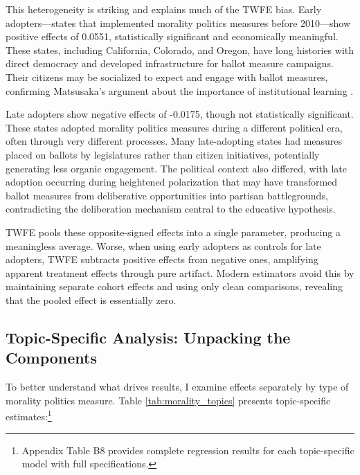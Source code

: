 \documentclass[12pt,letterpaper,oneside]{book}
\begin{document}
This heterogeneity is striking and explains much of the TWFE bias. Early adopters---states that implemented morality politics measures before 2010---show positive effects of 0.0551, statistically significant and economically meaningful. These states, including California, Colorado, and Oregon, have long histories with direct democracy and developed infrastructure for ballot measure campaigns. Their citizens may be socialized to expect and engage with ballot measures, confirming Matsusaka's argument about the importance of institutional learning \citep{matsusaka2004many}.

Late adopters show negative effects of -0.0175, though not statistically significant. These states adopted morality politics measures during a different political era, often through very different processes. Many late-adopting states had measures placed on ballots by legislatures rather than citizen initiatives, potentially generating less organic engagement. The political context also differed, with late adoption occurring during heightened polarization that may have transformed ballot measures from deliberative opportunities into partisan battlegrounds, contradicting the deliberation mechanism central to the educative hypothesis.

TWFE pools these opposite-signed effects into a single parameter, producing a meaningless average. Worse, when using early adopters as controls for late adopters, TWFE subtracts positive effects from negative ones, amplifying apparent treatment effects through pure artifact. Modern estimators avoid this by maintaining separate cohort effects and using only clean comparisons, revealing that the pooled effect is essentially zero.

\subsection{Topic-Specific Analysis: Unpacking the Components}

To better understand what drives results, I examine effects separately by type of morality politics measure. Table \ref{tab:morality_topics} presents topic-specific estimates:\footnote{Appendix Table B8 provides complete regression results for each topic-specific model with full specifications.}
\end{document}
